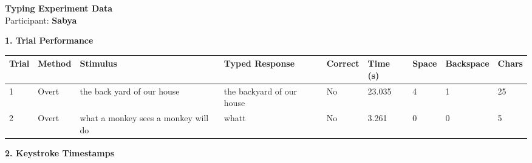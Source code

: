 \documentclass[10pt,a4paper]{article}
\begin{document}

\begin{center}
    {\Large\bfseries Typing Experiment Data}\\
    \vspace{2pt}
    Participant: \textbf{Sabya}
\end{center}

\vspace{0.25cm}


\noindent
{\large\bfseries 1. Trial Performance}

\vspace{0.08cm}

\begin{center}
\begin{tabularx}{\textwidth}{
    C{0.45in}
    C{0.65in}
    L{2.35in}
    L{2.55in}
    C{0.65in}
    C{0.65in}
    C{0.55in}
    C{0.75in}
    C{0.55in}
}
\toprule

\textbf{Trial} &
\textbf{Method} &
\textbf{Stimulus} &
\textbf{Typed Response} &
\textbf{Correct} &
\textbf{Time (s)} &
\textbf{Space} &
\textbf{Backspace} &
\textbf{Chars}
\\

\midrule

1 &
Overt &
the back yard of our house &
the backyard of our house &
No &
23.035 &
4 &
1 &
25
\\

2 &
Overt &
what a monkey sees a monkey will do &
whatt &
No &
3.261 &
0 &
0 &
5
\\

\bottomrule
\end{tabularx}
\end{center}

\vspace{0.35cm}


\noindent
{\large\bfseries 2. Keystroke Timestamps}

\vspace{0.08cm}
\end{document}
